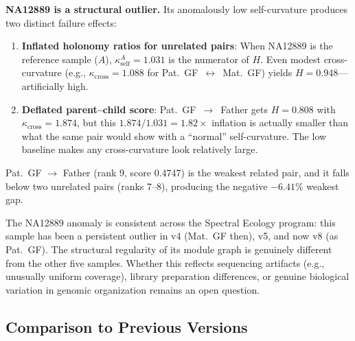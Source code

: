 \documentclass{../yalumba}
\begin{document}
\begin{limitation}
\textbf{NA12889 is a structural outlier.}  Its anomalously low self-curvature
produces two distinct failure effects:
\begin{enumerate}
  \item \textbf{Inflated holonomy ratios for unrelated pairs}: When
    NA12889 is the reference sample ($A$), $\kappa_{\text{self}}^A = 1.031$
    is the numerator of $H$.  Even modest cross-curvature (e.g.,
    $\kappa_{\text{cross}} = 1.088$ for Pat.~GF~$\leftrightarrow$~Mat.~GF)
    yields $H = 0.948$---artificially high.
  \item \textbf{Deflated parent--child score}: Pat.~GF~$\to$~Father gets
    $H = 0.808$ with $\kappa_{\text{cross}} = 1.874$, but this
    $1.874 / 1.031 = 1.82\times$ inflation is actually smaller than
    what the same pair would show with a ``normal'' self-curvature.  The
    low baseline makes any cross-curvature look relatively large.
\end{enumerate}
Pat.~GF $\to$ Father (rank 9, score 0.4747) is the weakest related pair,
and it falls below two unrelated pairs (ranks 7--8), producing the negative
$-6.41\%$ weakest gap.
\end{limitation}

The NA12889 anomaly is consistent across the Spectral Ecology program:
this sample has been a persistent outlier in v4 (Mat.~GF then), v5, and
now v8 (as Pat.~GF).  The structural regularity of its module graph is
genuinely different from the other five samples.  Whether this reflects
sequencing artifacts (e.g., unusually uniform coverage), library preparation
differences, or genuine biological variation in genomic organization
remains an open question.

\subsection{Comparison to Previous Versions}
\end{document}

